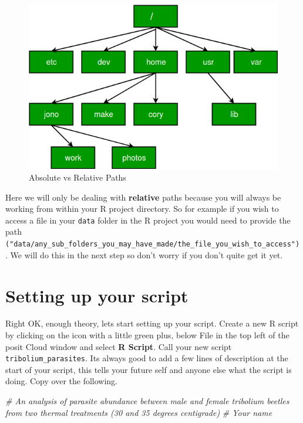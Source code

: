 \documentclass[
]{book}
\newenvironment{Shaded}{\begin{snugshade}}{\end{snugshade}}
\newcommand{\CommentTok}[1]{\textcolor[rgb]{0.56,0.35,0.01}{\textit{#1}}}
\begin{document}
\begin{figure}
\includegraphics[width=0.9\linewidth]{figures/absolutePathNames} \caption{Absolute vs Relative Paths}\label{fig:unnamed-chunk-27}
\end{figure}

Here we will only be dealing with \textbf{relative} paths because you will always be working from within your R project directory. So for example if you wish to access a file in your \texttt{data} folder in the R project you would need to provide the path \texttt{("data/any\_sub\_folders\_you\_may\_have\_made/the\_file\_you\_wish\_to\_access")}. We will do this in the next step so don't worry if you don't quite get it yet.

\section{Setting up your script}\label{script}

Right OK, enough theory, lets start setting up your script. Create a new R script by clicking on the icon with a little green plus, below File in the top left of the posit Cloud window and select \textbf{R Script}. Call your new script \texttt{tribolium\_parasites}. Its always good to add a few lines of description at the start of your script, this tells your future self and anyone else what the script is doing. Copy over the following.

\begin{Shaded}
\begin{Highlighting}[]
\CommentTok{\# An analysis of parasite abundance between male and female tribolium beetles from two thermal treatments (30 and 35 degrees centigrade)}
\CommentTok{\# Your name}
\end{Highlighting}
\end{Shaded}
\end{document}
